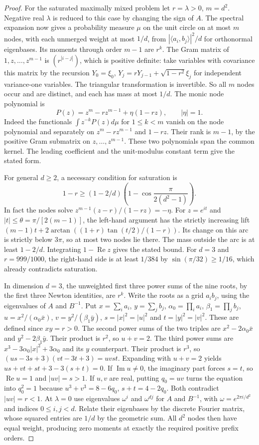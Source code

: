 \documentclass[aps,pra,onecolumn,superscriptaddress,nofootinbib,10pt]{revtex4-2}
\theoremstyle{definition}
\theoremstyle{remark}
\begin{document}
\begin{proof}
For the saturated maximally mixed problem let $r=\lambda>0$,
$m=d^2$. Negative real $\lambda$ is reduced to this case by
changing the sign of $A$. The spectral expansion now gives a probability
measure $\mu$ on the unit circle on at most $m$ nodes, with each
unmerged weight at most $1/d$, from $|\langle a_i,b_j\rangle|^2/d$
for orthonormal eigenbases. Its moments through order $m-1$ are $r^k$.
The Gram matrix of $1,z,\ldots,z^{m-1}$ is $(r^{|i-j|})$,
which is positive definite: take variables with covariance this
matrix by the recursion $Y_0=\xi_0$,
$Y_j=rY_{j-1}+\sqrt{1-r^2}\xi_j$ for independent variance-one
variables. The triangular transformation is invertible.
So all $m$ nodes occur and are distinct, and each has mass at most $1/d$.
The monic node polynomial is
\[
 P(z)=z^m-rz^{m-1}+\eta(1-rz),\qquad|\eta|=1.
\]
Indeed the functionals $\int z^{-k}P(z)d\mu$ for $1\le k<m$
vanish on the node polynomial and separately on
$z^m-rz^{m-1}$ and $1-rz$. Their rank is $m-1$, by the
positive Gram submatrix on $z,\ldots,z^{m-1}$. These two
polynomials span the common kernel. The leading coefficient and the
unit-modulus constant term give the stated form.

For general $d\ge2$, a necessary condition for saturation is
\[
 1-r\ge (1-2/d)\left(1-\cos\frac{\pi}{2(d^2-1)}\right).
\]
In fact the nodes solve $z^{m-1}(z-r)/(1-rz)=-\eta$.
For $z=e^{it}$ and $|t|\le\theta=\pi/[2(m-1)]$, the left-hand
argument has the strictly increasing lift
$(m-1)t+2\arctan((1+r)\tan(t/2)/(1-r))$.
Its change on this arc is strictly below $3\pi$, so at most two
nodes lie there. The mass outside the arc is at least $1-2/d$.
Integrating $1-\operatorname{Re}z$ gives the stated bound. For
$d=3$ and $r=999/1000$, the right-hand side is at least $1/384$
by $\sin(\pi/32)\ge 1/16$, which already contradicts saturation.

In dimension $d=3$, the unweighted first three power sums of
the nine roots, by the first three Newton identities, are $r^k$.
Write the roots as a grid $a_i b_j$, using the eigenvalues of
$A$ and $B^{-1}$. Put $x=\sum_i a_i$, $y=\sum_j b_j$,
$\alpha_0=\prod_i a_i$, $\beta_1=\prod_j b_j$,
$u=x^2/(\alpha_0\bar x)$, $v=y^2/(\beta_1\bar y)$,
$s=|x|^2=|u|^2$ and $t=|y|^2=|v|^2$. These are defined since
$xy=r>0$. The second power sums of the two triples are
$x^2-2\alpha_0\bar x$ and $y^2-2\beta_1\bar y$.
Their product is $r^2$, so $u+v=2$. The third power sums are
$x^3-3\alpha_0|x|^2+3\alpha_0$ and its $y$ counterpart.
Their product is $r^3$, so
$(us-3s+3)(vt-3t+3)=uvst$. Expanding with $u+v=2$ yields
$us+vt+st+3-3(s+t)=0$.
If $\operatorname{Im}u\ne0$, the imaginary part forces $s=t$,
so $\operatorname{Re}u=1$ and $|uv|=s>1$.
If $u,v$ are real, putting $q_0=uv$ turns the equation into
$q_0^2=1$ because $u^3+v^3=8-6q_0$, $s+t=4-2q_0$.
Both contradict $|uv|=r<1$.
At $\lambda=0$ use eigenvalues $\omega^i$ and $\omega^{dj}$
for $A$ and $B^{-1}$, with $\omega=e^{2\pi i/d^2}$ and indices
$0\le i,j<d$. Relate their eigenbases by the discrete Fourier
matrix, whose squared entries are $1/d$ by the geometric sum.
All $d^2$ nodes then have equal weight, producing zero moments
at exactly the required positive prefix orders.
\end{proof}
\end{document}
